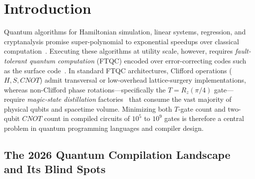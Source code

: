 \documentclass[11pt,a4paper]{article}
\theoremstyle{definition}
\begin{document}
\begin{abstract}
Across the complete \texttt{Cobble-Rz} and \texttt{Feynman} benchmark suites, our $O(n)$ pipeline---using \textbf{zero MURM lookup tables}---outperforms \texttt{tzap -O1} and \texttt{tzap -O3} (with a 200,000-entry MURM superoptimizer): on the 142,910-gate Hamiltonian simulation circuit from Figure 1 of ePrint 2026/2115, we reduce total gates by \textbf{94.37\%} (to \textbf{8,048} gates with \textsc{CAVA}, and \textbf{12,691} gates without \textsc{CAVA}, vs.\ \textbf{15,720} for \texttt{tzap -O3}, a \textbf{48.8\% reduction in remaining gates}), on \texttt{ols-ridge} (353,226 gates) by \textbf{95.83\%} (to \textbf{14,723} gates vs.\ \textbf{25,000}), across the 793,497-gate \texttt{Cobble-Rz} suite by \textbf{93.49\%} (to \textbf{51,647} gates and \textbf{20,139} $T$-gates), on \texttt{feynman/hwb12} (514,412 gates) by \textbf{100,448 more gates} and \textbf{62,238 more CNOTs} than \textsc{tzap}, and on \texttt{barenco\_tof\_10} to \textbf{72 $T$-gates} (vs.\ \textbf{100 $T$-gates} in Feynman, VOQC, PyZX, and tzap).
\end{abstract}

\section{Introduction}
\label{sec:intro}

Quantum algorithms for Hamiltonian simulation, linear systems, regression, and cryptanalysis promise super-polynomial to exponential speedups over classical computation~\cite{gilyen2019qsvt,low2019qsp,shor1994}. Executing these algorithms at utility scale, however, requires \emph{fault-tolerant quantum computation} (FTQC) encoded over error-correcting codes such as the surface code~\cite{fowler2012surface}. In standard FTQC architectures, Clifford operations ($H, S, \mathit{CNOT}$) admit transversal or low-overhead lattice-surgery implementations, whereas non-Clifford phase rotations---specifically the $T = R_z(\pi/4)$ gate---require \emph{magic-state distillation} factories~\cite{bravyi2005,litinski2019} that consume the vast majority of physical qubits and spacetime volume. Minimizing both $T$-gate count and two-qubit $\mathit{CNOT}$ count in compiled circuits of $10^5$ to $10^9$ gates is therefore a central problem in quantum programming languages and compiler design.

\subsection{The 2026 Quantum Compilation Landscape and Its Blind Spots}
\end{document}
